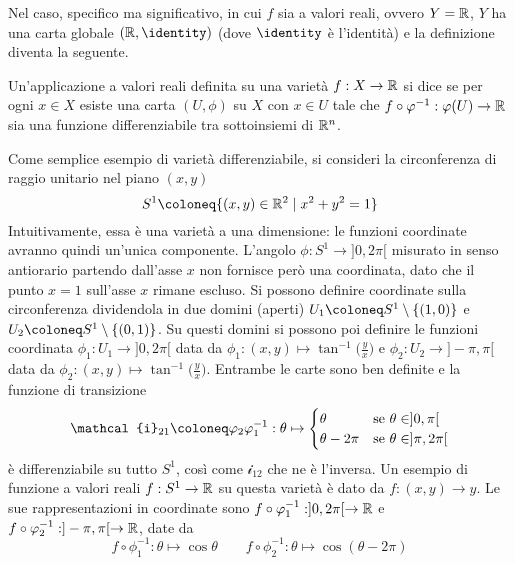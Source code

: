 Nel caso, specifico ma significativo, in cui $f$ sia a valori reali, ovvero $Y = \mathbb{R}$, $Y$ ha una carta globale $(\R, \identity)$ (dove $\identity$ è l'identità) e la definizione diventa la seguente.
\begin{definition}
  Un'applicazione a valori reali definita su una varietà $f:X\to \mathbb{R}$ si dice  se per ogni $x \in X$ esiste una carta $(U, \phi)$ su $X$ con $x \in  U$ tale che $f\circ \varphi^{-1}: \varphi(U) \to \mathbb{R}$ sia una funzione differenziabile tra sottoinsiemi di $\mathbb{R}^{n}$.
\end{definition}

Come semplice esempio di varietà differenziabile, si consideri la circonferenza di raggio unitario nel piano $(x,y)$
\begin{equation}
S^1 \defeq \{(x,y) \in \R^2 \mid x^2+y^2=1\} 
\end{equation} 
Intuitivamente, essa è una varietà a una dimensione: le funzioni coordinate avranno quindi un'unica componente. L'angolo $\phi: S^1 \to ]0,2 \pi[$ misurato in senso antiorario partendo dall'asse $x$ non fornisce però una coordinata, dato che il punto $x=1$ sull'asse $x$ rimane escluso. Si possono definire coordinate sulla circonferenza dividendola in due domini (aperti) $U_1 \defeq S^1 \setminus \{(1,0)\}$ e $U_2 \defeq S^1 \setminus \{(0,1)\}$. Su questi domini si possono poi definire le funzioni coordinata $\phi_1: U_1 \to ]0,2 \pi[$ data da $\phi_1: (x,y)\mapsto \tan^{-1}\Big(\frac{y}{x}\Big)$ e $\phi_2: U_2 \to ]-\pi,\pi[$ data da $\phi_2: (x,y)\mapsto \tan^{-1}\Big(\frac{y}{x}\Big)$. Entrambe le carte sono ben definite e la funzione di transizione
\begin{equation}
\mathcal{i}_{21} \defeq \phi_2\phi_1^{-1}: \theta \mapsto  \begin{cases}
  \theta & \text{se } \theta \in ]0, \pi[\\
  \theta-2\pi & \text{se } \theta \in ]\pi, 2\pi[\\
\end{cases}
\end{equation}
è differenziabile su tutto $S^1$, così come $\mathcal{i}_{12}$ che ne è l'inversa. Un esempio di funzione a valori reali $f:S^1 \to \mathbb{R}$ su questa varietà è dato da $f:(x,y)\to y$. Le sue rappresentazioni in coordinate sono $f \circ \varphi_1^{-1}: ]0, 2\pi[ \to \mathbb{R}$ e $f \circ \varphi_2^{-1}: ]- \pi, \pi[ \to \mathbb{R}$, date da
\begin{equation}
f \circ \phi_1^{-1}: \theta \mapsto \cos \theta \qquad f \circ \phi_2^{-1}: \theta \mapsto \cos(\theta - 2 \pi)
\end{equation} 

